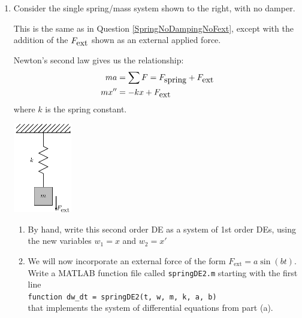 \begin{enumerate}
\begin{Solution}
\begin{enumerate}
\end{enumerate}
\end{Solution}



\item  \label{SpringNoDampingWithFext}
  \begin{Question}
    \begin{minipage}[t]{0.6\linewidth}
\vspace{0pt}
Consider the single spring/mass system shown to the right, with no damper.

This is the same as in Question \ref{SpringNoDampingNoFext}, except
with the addition of the $F_{\mbox{ext}}$ shown as an external applied force.

Newton's second law gives us the relationship:
\begin{align*}
ma & = \sum F = F_{\mbox{spring}} + F_{\mbox{ext}} \\
m x'' & = -k x + F_{\mbox{ext}} 
\end{align*}
where $k$ is the spring constant.
    \end{minipage}
    \begin{minipage}[t]{0.3\linewidth}
\vspace{0pt}
\begin{center}
\includegraphics[width=1.0in]{graphics/Week08_Spring/SpringNoDampingWithFext}
\end{center}
    \end{minipage}


\begin{enumerate}
\item By hand, write this second order DE as a system of 1st order
  DEs, using the new variables $w_1 = x$ and $w_2 = x'$


\item We will now incorporate an external force of the form
  $F_{\mbox{ext}} = a \sin(b t)$. Write a MATLAB function file called
  \verb#springDE2.m# starting with the first line \\
  \verb#function dw_dt = springDE2(t, w, m, k, a, b)# \\
  that implements the system of differential equations from part (a).


\end{enumerate}
\end{Question}
\end{enumerate}
